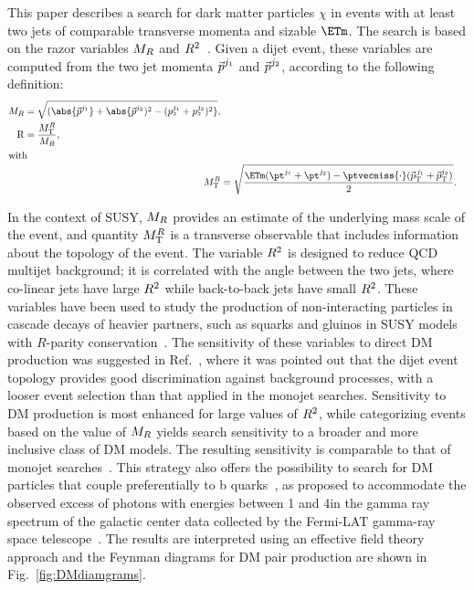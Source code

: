 This paper describes a search for dark matter particles $\chi$ in events with at least two jets of comparable transverse momenta
and sizable $\ETm$. The search is based
on the razor variables $M_R$ and $R^2$~\cite{rogan,razor2010}.  Given a
dijet event, these variables are computed from the two jet momenta $\vec{p\mkern0mu}^{j_1}$ and
$\vec{p\mkern0mu}^{j_2}$, according to the following
definition:
 \begin{align}
 \begin{split}
 \MR  & =
 \sqrt{
  (\abs{\vv{p}^{j_1}}+\abs{\vv{p}^{j_{2}})^2 -
  (p^{j_1}_{z}+p^{j_2}_{z})^2}},
\\
 \mathrm{R}  & =   \frac{M^{\RR}_\mathrm{T}}{\MR},
\label{eq:razor}
\end{split}\\
\intertext{with}
 \label{eq:MTR}
 M^{\RR}_\mathrm{T}  &=   \sqrt{ \frac{\ETm(\pt^{j_1}+\pt^{j_2}) -
   \ptvecmiss {\cdot}
   (\vv{p}_{\mathrm{T}}^{\,j_1}+\vv{p}_{\mathrm{T}}^{j_2})}{2}}.
\end{align}

In the context of SUSY, $M_R$ provides an estimate of the
underlying mass scale of the event, and quantity $M^{R}_\mathrm{T}$ is a transverse
observable that includes information about the
topology of the event. The variable $R^2$ is designed to reduce QCD
multijet background; it is correlated with the angle
between the two jets, where co-linear jets have large $R^2$ while back-to-back jets have small $R^2$.
These variables have been used to study the production of non-interacting
particles in cascade decays of heavier partners, such as squarks and
gluinos in SUSY models with $R$-parity
conservation~\cite{Chatrchyan:2014goa,Razor8TeV}. The sensitivity of
these variables to direct DM production was suggested in
Ref.~\cite{Fox:2012ee}, where it was pointed out that the dijet event
topology provides good discrimination against background processes,
with a looser event selection than that applied in the monojet searches.
Sensitivity to DM production is most enhanced for large values of $R^2$, while
categorizing events based on the value of $M_R$ yields search sensitivity to
a broader and more inclusive class of DM models. The resulting sensitivity is comparable to that of monojet 
searches~\cite{Fox:2012ee,Papucci:2014iwa}. This
strategy also offers the possibility to search for DM particles that
couple preferentially to b quarks~\cite{Agrawal:2014una}, as proposed
to accommodate the observed excess of photons with energies between
1 and 4\GeV in the gamma ray spectrum of the galactic center data collected by the Fermi-LAT gamma-ray space
telescope~\cite{Hooper:2010mq}. The results are interpreted using an
effective field theory approach and the Feynman diagrams for DM pair production are shown in Fig.~\ref{fig:DMdiamgrams}.

